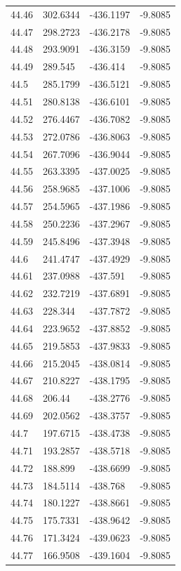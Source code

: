 \begin{table}[H]
\begin{tabular}{llll}
44.46 & 302.6344 & -436.1197 & -9.8085 \\
44.47 & 298.2723 & -436.2178 & -9.8085 \\
44.48 & 293.9091 & -436.3159 & -9.8085 \\
44.49 & 289.545 & -436.414 & -9.8085 \\
44.5 & 285.1799 & -436.5121 & -9.8085 \\
44.51 & 280.8138 & -436.6101 & -9.8085 \\
44.52 & 276.4467 & -436.7082 & -9.8085 \\
44.53 & 272.0786 & -436.8063 & -9.8085 \\
44.54 & 267.7096 & -436.9044 & -9.8085 \\
44.55 & 263.3395 & -437.0025 & -9.8085 \\
44.56 & 258.9685 & -437.1006 & -9.8085 \\
44.57 & 254.5965 & -437.1986 & -9.8085 \\
44.58 & 250.2236 & -437.2967 & -9.8085 \\
44.59 & 245.8496 & -437.3948 & -9.8085 \\
44.6 & 241.4747 & -437.4929 & -9.8085 \\
44.61 & 237.0988 & -437.591 & -9.8085 \\
44.62 & 232.7219 & -437.6891 & -9.8085 \\
44.63 & 228.344 & -437.7872 & -9.8085 \\
44.64 & 223.9652 & -437.8852 & -9.8085 \\
44.65 & 219.5853 & -437.9833 & -9.8085 \\
44.66 & 215.2045 & -438.0814 & -9.8085 \\
44.67 & 210.8227 & -438.1795 & -9.8085 \\
44.68 & 206.44 & -438.2776 & -9.8085 \\
44.69 & 202.0562 & -438.3757 & -9.8085 \\
44.7 & 197.6715 & -438.4738 & -9.8085 \\
44.71 & 193.2857 & -438.5718 & -9.8085 \\
44.72 & 188.899 & -438.6699 & -9.8085 \\
44.73 & 184.5114 & -438.768 & -9.8085 \\
44.74 & 180.1227 & -438.8661 & -9.8085 \\
44.75 & 175.7331 & -438.9642 & -9.8085 \\
44.76 & 171.3424 & -439.0623 & -9.8085 \\
44.77 & 166.9508 & -439.1604 & -9.8085 \\

\end{tabular}
\end{table}
